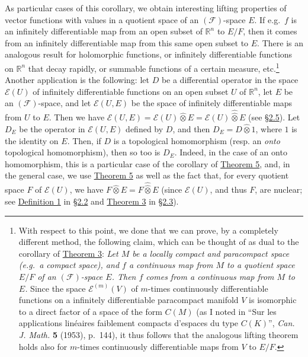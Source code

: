 \documentclass[british]{article}
\begin{document}
As particular cases of this corollary, we obtain interesting lifting
properties of vector functions with values in a quotient space of an
\((\mathscr{F})\)-space \(E\). If e.g.~\(f\) is an infinitely
differentiable map from an open subset of \(\mathbb{R}^n\) to \(E/F\),
then it comes from an infinitely differentiable map from this same open
subset to \(E\). There is an analogous result for holomorphic functions,
or infinitely differentiable functions on \(\mathbb{R}^n\) that decay
rapidly, or summable functions of a certain measure, etc.\footnote{With
  respect to this point, we done that we can prove, by a completely
  different method, the following claim, which can be thought of as dual
  to the corollary of \hyperref[section-1-theorem-3]{Theorem 3}:
  \emph{Let \(M\) be a locally compact and paracompact space (e.g.~a
  compact space), and \(f\) a continuous map from \(M\) to a quotient
  space \(E/F\) of an \((\mathscr{F})\)-space \(E\). Then \(f\) comes
  from a continuous map from \(M\) to \(E\).} Since the space
  \(\mathscr{E}^{(m)}(V)\) of \(m\)-times continuously differentiable
  functions on a infinitely differentiable paracompact manifold \(V\) is
  isomorphic to a direct factor of a space of the form \(C(M)\) (as I
  noted in ``Sur les applications linéaires faiblement compacts
  d'espaces du type \(C(K)\)'', \emph{Can. J. Math.} \textbf{5} (1953),
  p.~144), it thus follows that the analogous lifting theorem holds also
  for \(m\)-times continuously differentiable maps from \(V\) to
  \(E/F\).} Another application is the following: let \(D\) be a
differential operator in the space \(\mathscr{E}(U)\) of infinitely
differentiable functions on an open subset \(U\) of \(\mathbb{R}^n\),
let \(E\) be an \((\mathscr{F})\)-space, and let \(\mathscr{E}(U,E)\) be
the space of infinitely differentiable maps from \(U\) to \(E\). Then we
have
\(\mathscr{E}(U,E)=\mathscr{E}(U)\hat{\otimes}E=\mathscr{E}(U)\hat{\hat{\otimes}}E\)
(see \hyperref[section-2.5]{§2.5}). Let \(D_E\) be the operator in
\(\mathscr{E}(U,E)\) defined by \(D\), and then \(D_E=D\hat{\otimes}1\),
where \(1\) is the identity on \(E\). Then, if \(D\) is a topological
homomorphism (resp. an \emph{onto} topological homomorphism), then so
too is \(D_E\). Indeed, in the case of an onto homomorphism, this is a
particular case of the corollary of
\hyperref[section-1-theorem-5]{Theorem 5}, and, in the general case, we
use \hyperref[section-1-theorem-5]{Theorem 5} as well as the fact that,
for every quotient space \(F\) of \(\mathscr{E}(U)\), we have
\(F\hat{\otimes}E=F\hat{\hat{\otimes}}E\) (since \(\mathscr{E}(U)\), and
thus \(F\), are nuclear; see
\hyperref[section-2-definition-1]{Definition 1} in
\hyperref[section-2.2]{§2.2} and \hyperref[section-2-theorem-3]{Theorem
3} in \hyperref[section-2.3]{§2.3}).
\end{document}
